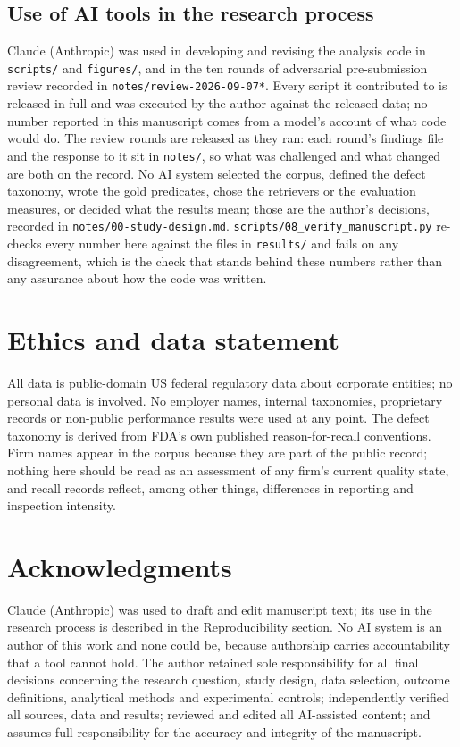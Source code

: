 \documentclass[acmsmall]{acmart}
\begin{document}
\subsection*{Use of AI tools in the research process}
Claude (Anthropic) was used in developing and revising the analysis code in \texttt{scripts/} and \texttt{figures/}, and in the ten rounds of adversarial pre-submission review recorded in \texttt{notes/review-2026-09-07*}. Every script it contributed to is released in full and was executed by the author against the released data; no number reported in this manuscript comes from a model's account of what code would do. The review rounds are released as they ran: each round's findings file and the response to it sit in \texttt{notes/}, so what was challenged and what changed are both on the record. No AI system selected the corpus, defined the defect taxonomy, wrote the gold predicates, chose the retrievers or the evaluation measures, or decided what the results mean; those are the author's decisions, recorded in \texttt{notes/00-study-design.md}. \texttt{scripts/08\_\allowbreak{}verify\_\allowbreak{}manuscript.py} re-checks every number here against the files in \texttt{results/} and fails on any disagreement, which is the check that stands behind these numbers rather than any assurance about how the code was written.


\section*{Ethics and data statement}
All data is public-domain US federal regulatory data about corporate entities; no personal data is involved. No employer names, internal taxonomies, proprietary records or non-public performance results were used at any point. The defect taxonomy is derived from FDA's own published reason-for-recall conventions. Firm names appear in the corpus because they are part of the public record; nothing here should be read as an assessment of any firm's current quality state, and recall records reflect, among other things, differences in reporting and inspection intensity.


\section*{Acknowledgments}
Claude (Anthropic) was used to draft and edit manuscript text; its use in the research process is described in the Reproducibility section. No AI system is an author of this work and none could be, because authorship carries accountability that a tool cannot hold. The author retained sole responsibility for all final decisions concerning the research question, study design, data selection, outcome definitions, analytical methods and experimental controls; independently verified all sources, data and results; reviewed and edited all AI-assisted content; and assumes full responsibility for the accuracy and integrity of the manuscript.




\end{document}
